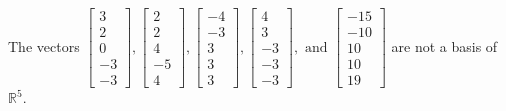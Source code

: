 \begin{exercise}
\begin{exerciseStatement}
  \end{exerciseStatement}
  \begin{exerciseAnswer}
   The vectors \(\left[\begin{array}{r}
3 \\
2 \\
0 \\
-3 \\
-3
\end{array}\right] , \left[\begin{array}{r}
2 \\
2 \\
4 \\
-5 \\
4
\end{array}\right] , \left[\begin{array}{r}
-4 \\
-3 \\
3 \\
3 \\
3
\end{array}\right] , \left[\begin{array}{r}
4 \\
3 \\
-3 \\
-3 \\
-3
\end{array}\right] , \text{ and } \left[\begin{array}{r}
-15 \\
-10 \\
10 \\
10 \\
19
\end{array}\right]\) 
  	 are not  a basis of \(\mathbb{R}^5\).
  


  \end{exerciseAnswer}
\end{exercise}